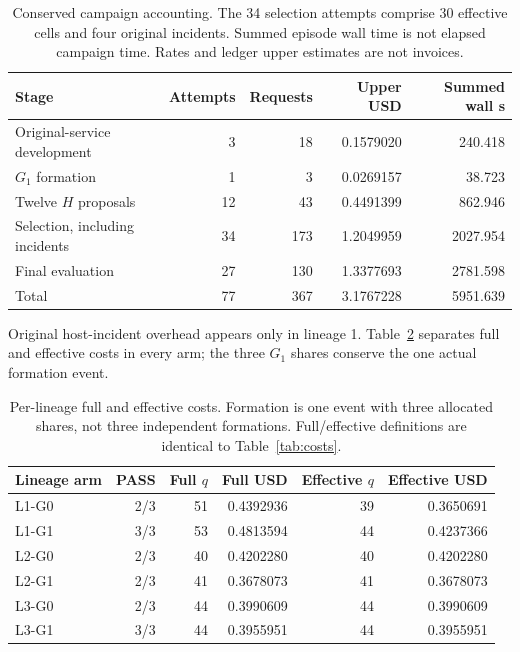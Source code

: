 \begin{table}[htbp]
\centering
\footnotesize
\begin{tabular}{lrrrr}
\toprule
Stage & Attempts & Requests & Upper USD & Summed wall s \\
\midrule
Original-service development & 3 & 18 & 0.1579020 & 240.418 \\
$G_1$ formation & 1 & 3 & 0.0269157 & 38.723 \\
Twelve $H$ proposals & 12 & 43 & 0.4491399 & 862.946 \\
Selection, including incidents & 34 & 173 & 1.2049959 & 2027.954 \\
Final evaluation & 27 & 130 & 1.3377693 & 2781.598 \\
Total & 77 & 367 & 3.1767228 & 5951.639 \\
\bottomrule
\end{tabular}
\caption{Conserved campaign accounting. The 34 selection attempts comprise 30 effective cells and four original incidents. Summed episode wall time is not elapsed campaign time. Rates and ledger upper estimates are not invoices.}
\label{tab:stages}
\end{table}

Original host-incident overhead appears only in lineage 1. Table~\ref{tab:lineage-costs}
separates full and effective costs in every arm; the three $G_1$ shares
conserve the one actual formation event.

\begin{table}[htbp]
\centering
\footnotesize
\begin{tabular}{lrrrrr}
\toprule
Lineage arm & PASS & Full $q$ & Full USD & Effective $q$ & Effective USD \\
\midrule
L1-G0 & 2/3 & 51 & 0.4392936 & 39 & 0.3650691 \\
L1-G1 & 3/3 & 53 & 0.4813594 & 44 & 0.4237366 \\
L2-G0 & 2/3 & 40 & 0.4202280 & 40 & 0.4202280 \\
L2-G1 & 2/3 & 41 & 0.3678073 & 41 & 0.3678073 \\
L3-G0 & 2/3 & 44 & 0.3990609 & 44 & 0.3990609 \\
L3-G1 & 3/3 & 44 & 0.3955951 & 44 & 0.3955951 \\
\bottomrule
\end{tabular}
\caption{Per-lineage full and effective costs. Formation is one event with three allocated shares, not three independent formations. Full/effective definitions are identical to Table~\ref{tab:costs}.}
\label{tab:lineage-costs}
\end{table}
\FloatBarrier

